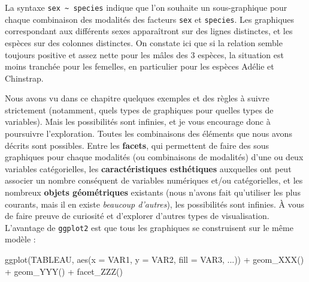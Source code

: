 \documentclass[
  a4paper,
  DIV=11,
  numbers=noendperiod,
  oneside]{scrreprt}
\newenvironment{Shaded}{}{}
\newcommand{\AttributeTok}[1]{\textcolor[rgb]{0.84,0.23,0.29}{#1}}
\newcommand{\FunctionTok}[1]{\textcolor[rgb]{0.44,0.26,0.76}{#1}}
\newcommand{\NormalTok}[1]{\textcolor[rgb]{0.14,0.16,0.18}{#1}}
\newcommand{\SpecialCharTok}[1]{\textcolor[rgb]{0.00,0.36,0.77}{#1}}
\begin{document}
La syntaxe \texttt{sex\ \textasciitilde{}\ species} indique que l'on
souhaite un sous-graphique pour chaque combinaison des modalités des
facteurs \texttt{sex} et \texttt{species}. Les graphiques correspondant
aux différents sexes apparaîtront sur des lignes distinctes, et les
espèces sur des colonnes distinctes. On constate ici que si la relation
semble toujours positive et assez nette pour les mâles des 3 espèces, la
situation est moins tranchée pour les femelles, en particulier pour les
espèces Adélie et Chinstrap.

Nous avons vu dans ce chapitre quelques exemples et des règles à suivre
strictement (notamment, quels types de graphiques pour quelles types de
variables). Mais les possibilités sont infinies, et je vous encourage
donc à poursuivre l'exploration. Toutes les combinaisons des éléments
que nous avons décrits sont possibles. Entre les \textbf{facets}, qui
permettent de faire des sous graphiques pour chaque modalités (ou
combinaisons de modalités) d'une ou deux variables catégorielles, les
\textbf{caractéristiques esthétiques} auxquelles ont peut associer un
nombre conséquent de variables numériques et/ou catégorielles, et les
nombreux \textbf{objets géométriques} existants (nous n'avons fait
qu'utiliser les plus courants, mais il en existe \emph{beaucoup
d'autres}), les possibilités sont infinies. À vous de faire preuve de
curiosité et d'explorer d'autres types de visualisation. L'avantage de
\texttt{ggplot2} est que tous les graphiques se construisent sur le même
modèle :

\begin{tcolorbox}[enhanced jigsaw, colbacktitle=quarto-callout-important-color!10!white, left=2mm, leftrule=.75mm, titlerule=0mm, bottomtitle=1mm, colback=white, breakable, arc=.35mm, bottomrule=.15mm, toprule=.15mm, toptitle=1mm, opacitybacktitle=0.6, title=\textcolor{quarto-callout-important-color}{\faExclamation}\hspace{0.5em}{Important}, coltitle=black, rightrule=.15mm, opacityback=0, colframe=quarto-callout-important-color-frame]

\begin{Shaded}
\begin{Highlighting}[]
\FunctionTok{ggplot}\NormalTok{(TABLEAU, }\FunctionTok{aes}\NormalTok{(}\AttributeTok{x =}\NormalTok{ VAR1, }\AttributeTok{y =}\NormalTok{ VAR2, }\AttributeTok{fill =}\NormalTok{ VAR3, ...)) }\SpecialCharTok{+}
  \FunctionTok{geom\_XXX}\NormalTok{() }\SpecialCharTok{+}
  \FunctionTok{geom\_YYY}\NormalTok{() }\SpecialCharTok{+}
  \FunctionTok{facet\_ZZZ}\NormalTok{()}
\end{Highlighting}
\end{Shaded}

\end{tcolorbox}
\end{document}
